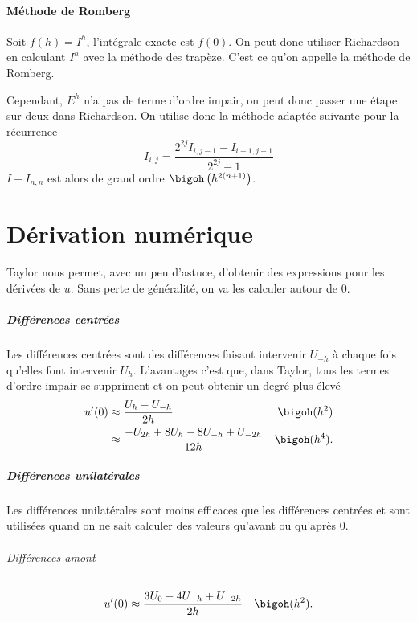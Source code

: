 
\subsection{Méthode de Romberg}
Soit $f(h) = I^h$, l'intégrale exacte est $f(0)$.
On peut donc utiliser Richardson en calculant
$I^h$ avec la méthode des trapèze.
C'est ce qu'on appelle la méthode de Romberg.

Cependant, $E^h$ n'a pas de terme d'ordre impair, on peut donc passer
une étape sur deux dans Richardson.
On utilise donc la méthode adaptée suivante pour la récurrence
\[ I_{i, j} = \frac{2^{2j} I_{i, j-1} - I_{i-1, j-1}}{2^{2j} - 1} \]
$I - I_{n, n}$ est alors de grand ordre $\bigoh\left(h^{2(n+1)}\right)$.

\part{Dérivation numérique}
Taylor nous permet, avec un peu d'astuce, d'obtenir des
expressions pour les dérivées de $u$.
Sans perte de généralité, on va les calculer autour de 0.

\subsubsection{Différences centrées}
Les différences centrées sont des différences faisant
intervenir $U_{-h}$ à chaque fois qu'elles font intervenir $U_{h}$.
L'avantages c'est que, dans Taylor, tous les termes d'ordre impair
se suppriment et on peut obtenir un degré plus élevé
\begin{align*}
  u'(0) & \approx \frac{U_h - U_{-h}}{2h} & \bigoh(h^2)\\
  & \approx \frac{-U_{2h} + 8U_h - 8U_{-h} + U_{-2h}}{12h} & \bigoh(h^4).
\end{align*}

\subsubsection{Différences unilatérales}
Les différences unilatérales sont moins efficaces que les différences
centrées et sont utilisées quand on ne sait calculer des valeurs qu'avant
ou qu'après 0.

\paragraph{Différences amont}
\begin{align*}
  u'(0) & \approx \frac{3U_0 - 4U_{-h} + U_{-2h}}{2h} & \bigoh(h^2).
\end{align*}

